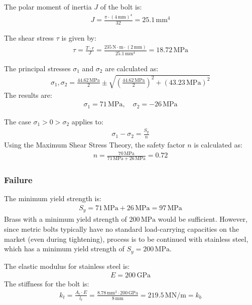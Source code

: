 \documentclass[12pt]{article}
\begin{document}
The polar moment of inertia \( J \) of the bolt is:
\begin{align}
J = \frac{\pi \cdot (4 \, \text{mm})^4}{32} = 25.1 \, \text{mm}^4
\end{align}

The shear stress \( \tau \) is given by:
\begin{align}
\tau = \frac{T \cdot r}{J} = \frac{235 \, \text{N} \cdot \text{m} \cdot (2 \, \text{mm})}{25.1 \, \text{mm}^4} = 18.72 \, \text{MPa}
\end{align}

The principal stresses \( \sigma_1 \) and \( \sigma_2 \) are calculated as:
\begin{align}
\sigma_1, \sigma_2 = \frac{44.62 \, \text{MPa}}{2} \pm \sqrt{\left( \frac{44.62 \, \text{MPa}}{2} \right)^2 + (43.23 \, \text{MPa})^2}
\end{align}
The results are:
\begin{align}
\sigma_1 = 71 \, \text{MPa}, \quad \sigma_2 = -26 \, \text{MPa}
\end{align}

The case \( \sigma_1 > 0 > \sigma_2 \) applies to:
\begin{align}
\sigma_1 - \sigma_2 = \frac{S_y}{n}
\end{align}
Using the Maximum Shear Stress Theory, the safety factor \( n \) is calculated as:
\begin{align}
n = \frac{70 \, \text{MPa}}{71 \, \text{MPa} + 26 \, \text{MPa}} = 0.72
\end{align}


\subsubsection{Failure}

The minimum yield strength is:
\begin{align}
S_y = 71 \, \text{MPa} + 26 \, \text{MPa} = 97 \, \text{MPa}
\end{align}
Brass with a minimum yield strength of \( 200 \, \text{MPa} \) would be sufficient. However, since metric bolts typically have no standard load-carrying capacities on the market (even during tightening), process is to be continued with stainless steel, which has a minimum yield strength of \( S_y = 200 \, \text{MPa} \).

The elastic modulus for stainless steel is:
\begin{align}
E = 200 \, \text{GPa}
\end{align}
The stiffness for the bolt is:
\begin{align}
k_t = \frac{A_t \cdot E}{l_t} = \frac{8.78 \, \text{mm}^2 \cdot 200 \, \text{GPa}}{8 \, \text{mm}} = 219.5 \, \text{MN/m} = k_b
\end{align}
\end{document}
